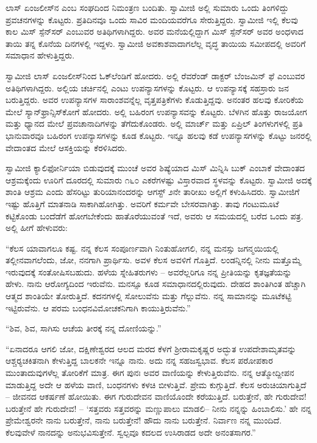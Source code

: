  ಲಾಸ್ ಏಂಜಲೀಸ್‍ನ  ಎಂಬ ಸಂಘದಿಂದ ನಿಮಂತ್ರಣ ಬಂದಿತು. ಸ್ವಾಮೀಜಿ ಅಲ್ಲಿ ಸುಮಾರು ಒಂದು ತಿಂಗಳಿದ್ದು ಪ್ರವಚನಗಳನ್ನು ಕೊಟ್ಟರು. ಪ್ರತಿದಿನವೂ ಒಂದು ಸಾವಿರ ಮಂದಿಯವರೆಗೂ ಸೇರುತ್ತಿದ್ದರು. ಸ್ವಾಮೀಜಿ ಇಲ್ಲಿ ಕೆಲವು ಕಾಲ ಮಿಸ್ ಸ್ಪೆನ್‍ಸರ್ ಎಂಬುವರ ಅತಿಥಿಗಳಾಗಿದ್ದರು. ಅವರ ಮನೆಯಲ್ಲಿದ್ದಾಗ ಮಿಸ್ ಸ್ಪೆನ್‍ಸರ್ ಅವರ ಅಂಧಳಾದ ತಾಯಿ ತನ್ನ ಕೊನೆಯ ದಿನಗಳಲ್ಲಿ ಇದ್ದಳು. ಸ್ವಾಮೀಜಿ ಅವಕಾಶವಾದಾಗಲೆಲ್ಲ ವೃದ್ಧ ತಾಯಿಯ ಸಮೀಪದಲ್ಲಿ ಅವರಿಗೆ ಸಮಾಧಾನ ಹೇಳುತ್ತಿದ್ದರು. 

 ಸ್ವಾಮೀಜಿ ಲಾಸ್ ಏಂಜಲೀಸ್‍ನಿಂದ ಓಕ್‍ಲೆಂಡಿಗೆ ಹೋದರು. ಅಲ್ಲಿ ರೆವರೆಂಡ್ ಡಾಕ್ಟರ್ ಬೆಂಜಮಿನ್ ಫೆ ಎಂಬುವರ ಅತಿಥಿಗಳಾಗಿದ್ದರು. ಅಲ್ಲಿಯ ಚರ್ಚಿನಲ್ಲಿ ಎಂಟು ಉಪನ್ಯಾಸಗಳನ್ನು ಕೊಟ್ಟರು. ಆ ಉಪನ್ಯಾಸಕ್ಕೆ ಸಹಸ್ರಾರು ಜನ ಬರುತ್ತಿದ್ದರು. ಅವರ ಉಪನ್ಯಾಸಗಳ ಸಾರಾಂಶವನ್ನೆಲ್ಲ ವೃತ್ತಪತ್ರಿಕೆಗಳು ಕೊಡುತ್ತಿದ್ದವು. ಅನಂತರ ಹಲವು ಕೋರಿಕೆಯ ಮೇಲೆ ಸ್ಯಾನ್‍ಫ್ರಾನ್ಸಿಸ್‍ಕೋಗೆ ಹೋದರು. ಅಲ್ಲಿ ಬಹಿರಂಗ ಉಪನ್ಯಾಸವನ್ನು ಕೊಟ್ಟರು. ಬೆಳಗಿನ ಹೊತ್ತು ರಾಜಯೋಗ ಮತ್ತು ಧ್ಯಾನದ ಮೇಲೆ ಪ್ರವಚಾನಾದಿಗಳನ್ನು ತೆಗೆದುಕೊಂಡರು. ಅಲ್ಲಿ ಮಾರ್ಚ್ ಮತ್ತು ಏಪ್ರಿಲ್ ತಿಂಗಳುಗಳಲ್ಲಿ ಪ್ರತಿ ಭಾನುವಾರವೂ ಬಹಿರಂಗ ಉಪನ್ಯಾಸಗಳನ್ನು ಕೂಡ ಕೊಟ್ಟರು. ಇನ್ನೂ ಹಲವು ಕಡೆ ಉಪನ್ಯಾಸಗಳನ್ನು ಕೊಟ್ಟು ಜನರಲ್ಲಿ ವೇದಾಂತದ ಮೇಲೆ ಆಸಕ್ತಿಯನ್ನು ಕೆರಳಿಸಿದರು. 

 ಸ್ವಾಮೀಜಿ ಕ್ಯಾಲಿಫೋರ್ನಿಯಾ ಬಿಡುವುದಕ್ಕೆ ಮುಂಚೆ ಅವರ ಶಿಷ್ಯೆಯಾದ ಮಿಸ್ ಮಿನ್ನಿಸಿ ಬುಕ್ ಎಂಬಾಕೆ ವೇದಾಂತದ ಆಶ್ರಮಕ್ಕೆಂದು ಊರಿಗೆ ದೂರದಲ್ಲಿ ಸುಮಾರು ೧೬೦ ಎಕರೆಗಳಷ್ಟು ವಿಸ್ತಾರವಾದ ಸ್ಥಳವನ್ನು ಕೊಟ್ಟರು. ಸ್ವಾಮೀಜಿ ಅದಕ್ಕೆ ಶಾಂತಿ ಆಶ್ರಮ ಎಂದು ಹೆಸರಿಟ್ಟು ತುರಿಯಾನಂದರನ್ನು ಆಗಸ್ಟ್ ೨ನೇ ತಾರೀಖು ಅಲ್ಲಿಗೆ ಕಳುಹಿಸಿದರು. ಸ್ವಾಮೀಜಿಗೆ ಇಷ್ಟು ಹೊತ್ತಿಗೆ ಮಾತನಾಡಿ ಸಾಕಾಗಿಹೋಗಿತ್ತು. ಅವರಿಗೆ ಕರ್ಮವೇ ಬೇಸರವಾಗಿತ್ತು. ತಾವು ಗಂಟುಮೂಟೆ ಕಟ್ಟಿಕೊಂಡು ಬಂದೆಡೆಗೆ ಹೋಗಬೇಕೆಂದು ಹಾತೊರೆಯುವಂತೆ ಇದೆ, ಅವರು ಆ ಸಮಯದಲ್ಲಿ ಬರೆದ ಒಂದು ಪತ್ರ. ಅಲ್ಲಿ ಹೀಗೆ ಹೇಳುವರು: 

 “ಕೆಲಸ ಯಾವಾಗಲೂ ಕಷ್ಟ. ನನ್ನ ಕೆಲಸ ಸಂಪೂರ್ಣವಾಗಿ ನಿಂತುಹೋಗಲಿ, ನನ್ನ ಮನಸ್ಸು ಜಗನ್ಮಯಿಯಲ್ಲಿ ತಲ್ಲೀನವಾಗಲೆಂದು, ಜೋ, ನನಗಾಗಿ ಪ್ರಾರ್ಥಿಸು. ಅವಳ ಕೆಲಸ ಅವಳಿಗೆ ಗೊತ್ತಿದೆ. ಲಂಡನ್ನಿನಲ್ಲಿ ನೀನು ಮತ್ತೊಮ್ಮೆ ಇರುವುದಕ್ಕೆ ಸಂತೋಷಿಸಬಹುದು. ಹಳೆಯ ಸ್ನೇಹಿತರುಗಳು – ಅವರೆಲ್ಲರಿಗೂ ನನ್ನ ಪ್ರೀತಿಯನ್ನು ಕೃತಜ್ಞತೆಯನ್ನು ಹೇಳು. ನಾನು ಆರೋಗ್ಯದಿಂದ ಇರುವೆನು. ಮನಸ್ಸೂ ಕೂಡ ಸಮಾಧಾನದಲ್ಲಿರುವುದು. ದೇಹದ ಶಾಂತಿಗಿಂತ ಹೆಚ್ಚಾಗಿ ಆತ್ಮದ ಶಾಂತಿಯೇ ತೋರುತ್ತಿದೆ. ಕದನಗಳಲ್ಲಿ ಸೋಲುವೆನು ಮತ್ತು ಗೆಲ್ಲುವೆನು. ನನ್ನ ಸಾಮಾನನ್ನು ಮೂಟೆಕಟ್ಟಿ ಇಟ್ಟಿರುವೆನು. ಆ ಪರಮ ಬಂಧನವಿಮೋಚಕನಿಗಾಗಿ ಕಾಯುತ್ತಿರುವೆನು.” 

 “ಶಿವ, ಶಿವ, ಸಾಗಿಸು ಆಚೆಯ ತೀರಕ್ಕೆ ನನ್ನ ದೋಣಿಯನ್ನು.” 

 “ಏನಾದರೂ ಆಗಲಿ ಜೋ, ದಕ್ಷಿಣೇಶ್ವರದ ಆಲದ ಮರದ ಕೆಳಗೆ ಶ‍್ರೀರಾಮಕೃಷ್ಣರ ಅದ್ಭುತ ಉಪದೇಶಾಮೃತವನ್ನು ಆಶ್ಚರ‍್ಯಚಕಿತನಾಗಿ ಕೇಳುತ್ತಿದ್ದ ಬಾಲಕನೇ ಇನ್ನೂ ನಾನು. ಅದು ನನ್ನ ಸಹಜಸ್ವಭಾವ. ಕೆಲಸ ಪರೋಪಕಾರ ಮುಂತಾದುವುಗಳೆಲ್ಲ ತೋರಿಕೆಗೆ ಮಾತ್ರ. ಈಗ ಪುನಃ ಅವರ ವಾಣಿಯನ್ನು ಕೇಳುತ್ತಿರುವೆನು. ನನ್ನ ಆತ್ಮೋದ್ದೀಪನ ಮಾಡುತ್ತಿದ್ದ ಅದೇ ಆ ಹಳೆಯ ವಾಣಿ, ಬಂಧನಗಳು ಕಳಚಿ ಬೀಳುತ್ತಿವೆ. ಪ್ರೇಮ ಕುಗ್ಗುತ್ತಿದೆ. ಕೆಲಸ ಅರುಚಿಯಾಗುತ್ತಿದೆ – ಜೀವನದ ಆಕರ್ಷಣೆ ಹೋಯಿತು. ಈಗ ಗುರುದೇವನ ವಾಣಿಯೊಂದೇ ಕರೆಯುತ್ತಿದೆ. ಬರುತ್ತೇನೆ, ಹೇ ಗುರುದೇವ! ಬರುತ್ತೇನೆ ಹೇ ಗುರುದೇವ! – ‘ಸತ್ತವರು ಸತ್ತವರನ್ನು ಮಣ್ಣುಪಾಲು ಮಾಡಲಿ– ನೀನು ನನ್ನನ್ನು ಹಿಂಬಾಲಿಸು.’ ಹೇ ನನ್ನ ಪ್ರೇಮೇಶ್ವರನೇ ನಾನು ಬರುತ್ತೇನೆ, ನಾನು ಬರುತ್ತೇನೆ! ಹೌದು ನಾನು ಬರುತ್ತೇನೆ. ನಿರ್ವಾಣ ನನ್ನ ಮುಂದಿದೆ. ಕೆಲವುವೇಳೆ ನಾನದನ್ನು ಅನುಭವಿಸುತ್ತೇನೆ. ಸ್ವಲ್ಪವೂ ಕದಲದ ಉಸಿರಾಡದ ಅದೇ ಅನಂತಸಾಗರ.” 

